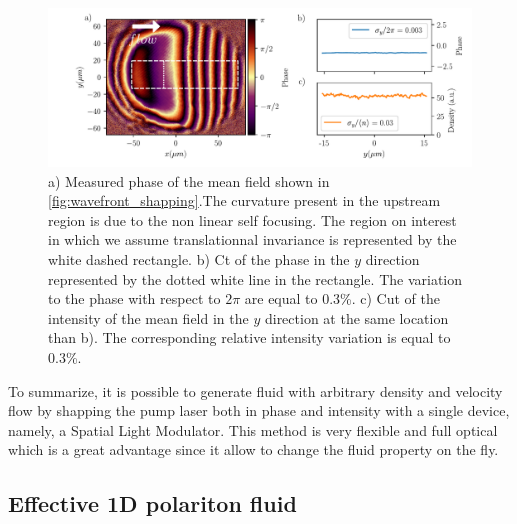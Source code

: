 \begin{figure}
    \centering
    \includegraphics[width=1\textwidth]{chap3_custom_st/fig/phase_example.pdf}
    \caption{a) Measured phase of the mean field shown in \autoref{fig:wavefront_shapping}.The curvature present in the upstream region is due to the non linear self focusing. The region
    on interest in which we assume translationnal invariance is represented by the white dashed rectangle. b)  Ct of the phase in the $y$ direction represented by the dotted white line in the rectangle. The variation to the phase with respect
    to $2\pi$ are equal to 0.3\%. c) Cut of the intensity of the mean field in the $y$ direction at the same location than b). The corresponding relative intensity variation is equal to 0.3\%.}
    \label{fig:phase_example}
\end{figure}

To summarize, it is possible to generate fluid with arbitrary density and velocity flow by shapping the pump laser both in phase and intensity with a single device, namely, a Spatial Light Modulator. This method is very flexible and full optical
which is a great advantage since it allow to change the fluid property on the fly. 

\subsection{Effective 1D polariton fluid}

